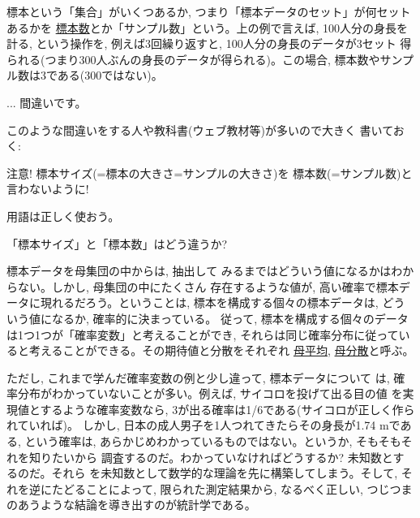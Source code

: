 標本という「集合」がいくつあるか, つまり「標本データのセット」が何セットあるかを
\underline{標本数}とか「サンプル数」という。上の例で言えば, 100人分の身長を計る, 
という操作を, 例えば3回繰り返すと, 100人分の身長のデータが3セット
得られる(つまり300人ぶんの身長のデータが得られる)。この場合, 
標本数やサンプル数は3である(300ではない)。

\begin{freqmiss}{\small{} ... 間違いです。}\end{freqmiss}

このような間違いをする人や教科書(ウェブ教材等)が多いので大きく
書いておく:

\begin{itembox}{注意!}
標本サイズ(=標本の大きさ=サンプルの大きさ)を
標本数(=サンプル数)と言わないように!
\end{itembox}

用語は正しく使おう。\\


\begin{q}\label{q:stat_size_num_def} 「標本サイズ」と「標本数」はどう違うか?
\end{q}\mv

標本データを母集団の中からは, 抽出して
みるまではどういう値になるかはわからない。しかし, 母集団の中にたくさん
存在するような値が, 高い確率で標本データに現れるだろう。ということは, 
標本を構成する個々の標本データは, どういう値になるか, 確率的に決まっている。
従って, 標本を構成する個々のデータは1つ1つが「確率変数」と考えることができ, 
それらは同じ確率分布に従っていると考えることができる。その期待値と分散をそれぞれ
\underline{母平均}, 
\underline{母分散}と呼ぶ。

ただし, これまで学んだ確率変数の例と少し違って, 標本データについて
は, 確率分布がわかっていないことが多い。例えば, サイコロを投げて出る目の値
を実現値とするような確率変数なら, 3が出る確率は1/6である{\small(サイコロが正しく作られていれば)}。
しかし, 日本の成人男子を1人つれてきたらその身長が1.74 mである, という確率は, 
あらかじめわかっているものではない。というか, そもそもそれを知りたいから
調査するのだ。わかっていなければどうするか? 未知数とするのだ。それら
を未知数として数学的な理論を先に構築してしまう。そして, それを逆にたどることによって, 
限られた測定結果から, なるべく正しい, つじつまのあうような結論を導き出すのが統計学である。\\

